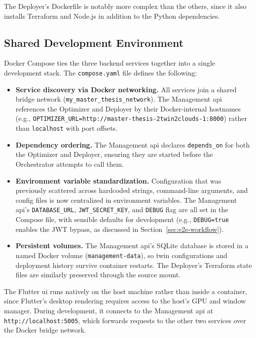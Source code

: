 The Deployer's Dockerfile is notably more complex than the others, since it also installs Terraform and Node.js in addition to the Python dependencies. %

\subsection{Shared Development Environment}
\label{sec:shared-dev-env}

Docker Compose ties the three backend services together into a single development stack. The \texttt{compose.yaml} file defines the following:

\begin{itemize}
    \item \textbf{Service discovery via Docker networking.} All services join a shared bridge network (\texttt{my\_master\_thesis\_network}). The Management \gls{api} references the Optimizer and Deployer by their Docker-internal hostnames (e.g., \texttt{OPTIMIZER\_URL=http://master-thesis-2twin2clouds-1:8000}) rather than \texttt{localhost} with port offsets.
    \item \textbf{Dependency ordering.} The Management \gls{api} declares \texttt{depends\_on} for both the Optimizer and Deployer, ensuring they are started before the Orchestrator attempts to call them.
    \item \textbf{Environment variable standardization.} Configuration that was previously scattered across hardcoded strings, command-line arguments, and config files is now centralized in environment variables. The Management \gls{api}'s \texttt{DATABASE\_URL}, \texttt{JWT\_SECRET\_KEY}, and \texttt{DEBUG} flag are all set in the Compose file, with sensible defaults for development (e.g., \texttt{DEBUG=true} enables the JWT bypass, as discussed in Section~\ref{sec:e2e-workflow}).
    \item \textbf{Persistent volumes.} The Management \gls{api}'s SQLite database is stored in a named Docker volume (\texttt{management-data}), so twin configurations and deployment history survive container restarts. The Deployer's Terraform state files are similarly preserved through the source mount.
\end{itemize}

The Flutter \gls{ui} runs natively on the host machine rather than inside a container, since Flutter's desktop rendering requires access to the host's GPU and window manager. During development, it connects to the Management \gls{api} at \texttt{http://localhost:5005}, which forwards requests to the other two services over the Docker bridge network.

